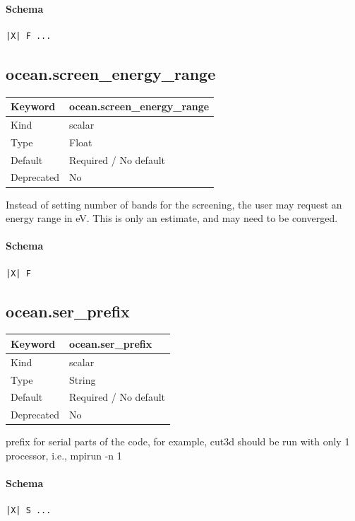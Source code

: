 \documentclass[11pt]{article}
\begin{document}
{{{{{\paragraph{Schema}
\begin{Verbatim}
|X| F ...
\end{Verbatim}

\subsection{ocean.screen\_energy\_range}
\label{kw:ocean-screen-energy-range}
\begin{longtable}{|p{1.5in}|p{4.5in}|}
\hline
Keyword & ocean.screen\_energy\_range \\
\hline
Kind & scalar \\
\hline
Type & Float \\
\hline
Default & Required / No default \\
\hline
Deprecated & No \\
\hline
\end{longtable}
 Instead of setting number of bands for the screening, the user may request
 an energy range in eV. This is only an estimate, and may need to be converged.

\paragraph{Schema}
\begin{Verbatim}
|X| F
\end{Verbatim}

\subsection{ocean.ser\_prefix}
\label{kw:ocean-ser-prefix}
\begin{longtable}{|p{1.5in}|p{4.5in}|}
\hline
Keyword & ocean.ser\_prefix \\
\hline
Kind & scalar \\
\hline
Type & String \\
\hline
Default & Required / No default \\
\hline
Deprecated & No \\
\hline
\end{longtable}
 prefix for serial parts of the code, for example, cut3d should be run
 with only 1 processor, i.e., mpirun -n 1

\paragraph{Schema}
\begin{Verbatim}
|X| S ...
\end{Verbatim}

}}}}}
\end{document}

